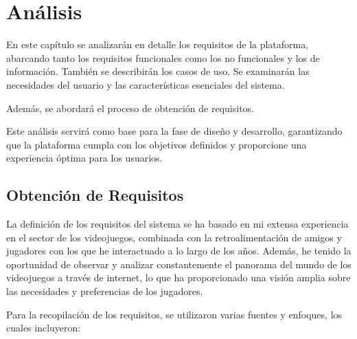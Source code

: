 \chapter{Análisis}

En este capítulo se analizarán en detalle los requisitos de la plataforma, abarcando tanto los requisitos funcionales como los no funcionales y los de información. También se describirán los casos de uso. Se examinarán las necesidades del usuario y las características esenciales del sistema.

Además, se abordará el proceso de obtención de requisitos.

Este análisis servirá como base para la fase de diseño y desarrollo, garantizando que la plataforma cumpla con los objetivos definidos y proporcione una experiencia óptima para los usuarios.

\newpage
\section{Obtención de Requisitos}

La definición de los requisitos del sistema se ha basado en mi extensa experiencia en el sector de los videojuegos, combinada con la retroalimentación de amigos y jugadores con los que he interactuado a lo largo de los años. Además, he tenido la oportunidad de observar y analizar constantemente el panorama del mundo de los videojuegos a través de internet, lo que ha proporcionado una visión amplia sobre las necesidades y preferencias de los jugadores.

Para la recopilación de los requisitos, se utilizaron varias fuentes y enfoques, los cuales incluyeron:

